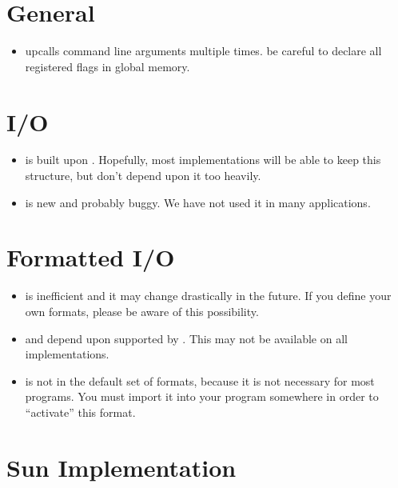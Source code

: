 \section{General}
\begin{itemize}
\item
     upcalls command line arguments multiple times.
    be careful to declare all registered flags in global memory. 
\end{itemize}


\section{I/O}
\begin{itemize}
\item
     is built upon .  Hopefully,
    most implementations will be able to keep this structure, but
    don't depend upon it too heavily.
\item
     is new and probably buggy.  We have not used it
    in many applications.  
\end{itemize}

\section{Formatted I/O}

\begin{itemize}
\item	
     is inefficient and it may change drastically in
    the future.  If you define your own formats, please be aware of
    this possibility.
\item
     and  depend upon 
    supported by .  This may not be available on
    all implementations.
\item
     is not in the default set of formats, because it
    is not necessary for most programs.  You must import it into your
    program somewhere in order to ``activate'' this format.
\end{itemize}


\section{Sun Implementation}


